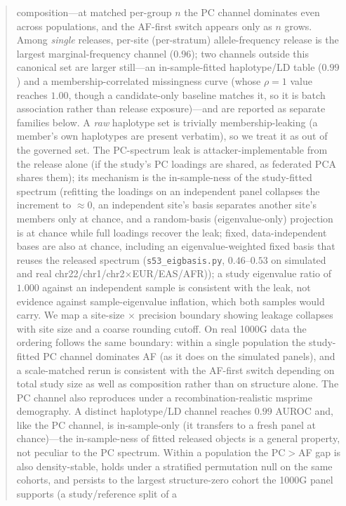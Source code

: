 \documentclass[11pt]{article}
\begin{document}
\begin{abstract}
composition---at
matched per-group $n$ the PC channel dominates even across populations, and the
AF-first switch appears only as $n$ grows. Among \emph{single} releases, per-site
(per-stratum) allele-frequency release is the largest marginal-frequency channel
($0.96$); two channels outside this canonical set are larger still---an
in-sample-fitted haplotype/LD table ($0.99$) and a membership-correlated
missingness curve (whose $\rho{=}1$ value reaches $1.00$, though a
candidate-only baseline matches it, so it is batch association rather than
release exposure)---and are reported as separate families below. A \emph{raw}
haplotype set is trivially membership-leaking (a member's own haplotypes are
present verbatim), so we treat it as out of the governed set. The PC-spectrum
leak is
attacker-implementable from the release alone (if the study's PC loadings are
shared, as federated PCA shares them); its mechanism is the in-sample-ness of
the study-fitted spectrum (refitting the
loadings on an independent panel collapses the increment to $\approx 0$, an
independent site's basis separates another site's members only at chance, and a
random-basis (eigenvalue-only) projection is at chance while full loadings
recover the leak; fixed, data-independent bases are also at chance, including an
eigenvalue-weighted fixed basis that reuses the released spectrum
(\texttt{s53\_eigbasis.py}, $0.46$--$0.53$ on simulated and real
chr22/chr1/chr2$\times$EUR/EAS/AFR)); a study
eigenvalue ratio of $1.000$ against an independent sample is consistent with the
leak, not evidence against sample-eigenvalue inflation, which both samples would
carry. We
map a site-size $\times$ precision boundary showing leakage collapses with site
size and a coarse rounding cutoff. On real 1000G data the ordering follows the
same boundary: within a single population the study-fitted PC channel dominates
AF (as it does on the simulated panels), and a scale-matched rerun is consistent
with the
AF-first switch depending on total study size as well as composition rather than
on
structure alone. The PC channel
also reproduces under a recombination-realistic msprime demography. A distinct
haplotype/LD channel reaches $0.99$ AUROC and, like the PC channel, is
in-sample-only (it transfers to a fresh panel at chance)---the in-sample-ness of
fitted released objects is a general property, not peculiar to the PC spectrum.
Within a population the PC$>$AF gap is also density-stable, holds under a
stratified permutation null on the same cohorts, and persists to the largest
structure-zero cohort the 1000G panel supports (a study/reference split of a

\end{abstract}
\end{document}
